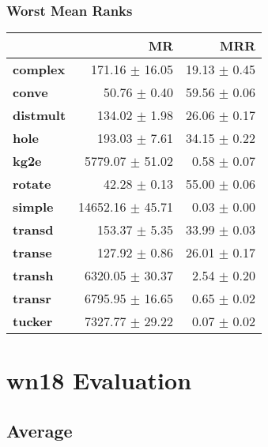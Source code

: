 \documentclass{article}
\begin{document}
    \subsubsection{Worst Mean Ranks}
    \begin{center}
    \begin{tabular}{lrr}
\toprule
{} &                MR &           MRR \\
\midrule
\textbf{complex } &    171.16 $\pm$ 16.05 &  19.13 $\pm$ 0.45 \\
\textbf{conve   } &      50.76 $\pm$ 0.40 &  59.56 $\pm$ 0.06 \\
\textbf{distmult} &     134.02 $\pm$ 1.98 &  26.06 $\pm$ 0.17 \\
\textbf{hole    } &     193.03 $\pm$ 7.61 &  34.15 $\pm$ 0.22 \\
\textbf{kg2e    } &   5779.07 $\pm$ 51.02 &   0.58 $\pm$ 0.07 \\
\textbf{rotate  } &      42.28 $\pm$ 0.13 &  55.00 $\pm$ 0.06 \\
\textbf{simple  } &  14652.16 $\pm$ 45.71 &   0.03 $\pm$ 0.00 \\
\textbf{transd  } &     153.37 $\pm$ 5.35 &  33.99 $\pm$ 0.03 \\
\textbf{transe  } &     127.92 $\pm$ 0.86 &  26.01 $\pm$ 0.17 \\
\textbf{transh  } &   6320.05 $\pm$ 30.37 &   2.54 $\pm$ 0.20 \\
\textbf{transr  } &   6795.95 $\pm$ 16.65 &   0.65 $\pm$ 0.02 \\
\textbf{tucker  } &   7327.77 $\pm$ 29.22 &   0.07 $\pm$ 0.02 \\
\bottomrule
\end{tabular}

    \end{center}

\section{wn18 Evaluation}
    \subsection{Average}
\end{document}
